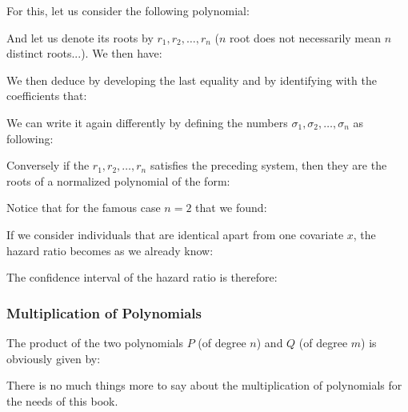 	For this, let us consider the following polynomial:
	
	And let us denote its roots by $r_1,r_2,\ldots,r_n$ ($n$ root does not necessarily  mean $n$ distinct roots...). We then have:
	
	We then deduce by developing the last equality and by identifying with the coefficients that:
	
	We can write it again differently by defining the numbers $\sigma_1,\sigma_2,\ldots,\sigma_n$ as following:
	
	Conversely if the $r_1,r_2,\ldots,r_n$ satisfies the preceding system, then they are the roots of a normalized polynomial of the form:
	
	Notice that for the famous case $n=2$ that we found:
	
		
		If we consider individuals that are identical apart from one covariate $x$, the hazard ratio becomes as we already know:
	
	The confidence interval of the hazard ratio is therefore:
	
	
	\subsubsection{Multiplication of Polynomials}\label{polynomials multiplication}
	The product of the two polynomials $P$ (of degree $n$) and $Q$ (of degree $m$) is
obviously given by:
	
	There is no much things more to say about the multiplication of polynomials for the needs of this book.
	
